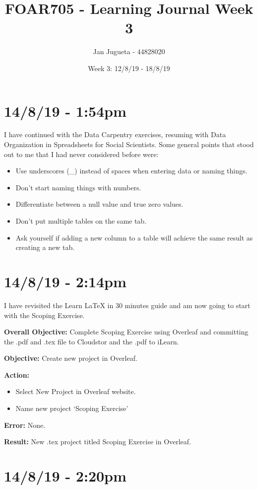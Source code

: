 \documentclass{article}
\title{FOAR705 - Learning Journal Week 3}
\author{Jan Jugueta - 44828020}
\date{Week 3: 12/8/19 - 18/8/19}
\begin{document}
\maketitle

\section*{14/8/19 - 1:54pm}

I have continued with the Data Carpentry exercises, resuming with Data Organization in Spreadsheets for Social Scientists. Some general points that stood out to me that I had never considered before were:
\begin{itemize}
    \item Use underscores (\_) instead of spaces when entering data or naming things.
    \item Don’t start naming things with numbers.
    \item Differentiate between a null value and true zero values.
    \item Don’t put multiple tables on the same tab.
    \item Ask yourself if adding a new column to a table will achieve the same result as creating a new tab.
\end{itemize}

\section*{14/8/19 - 2:14pm}

I have revisited the Learn LaTeX in 30 minutes guide and am now going to start with the Scoping Exercise.

\textbf{Overall Objective:} Complete Scoping Exercise using Overleaf and committing the .pdf and .tex file to Cloudstor and the .pdf to iLearn.

\textbf{Objective:} Create new project in Overleaf.

\textbf{Action:} 
\begin{itemize}
    \item Select New Project in Overleaf website.
    \item Name new project ‘Scoping Exercise’
\end{itemize}

\textbf{Error:} None.

\textbf{Result:} New .tex project titled Scoping Exercise in Overleaf.

\section*{14/8/19 - 2:20pm}
\end{document}
